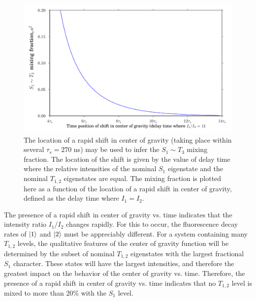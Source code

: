 \documentclass[12pt]{mitthesis}
\begin{document}
\begin{figure}
  \caption{The location of a rapid shift in center of gravity (taking
    place within several $\tau_s = 270$ ns) may be used to infer the
    $S_1 \sim T_3$ mixing fraction.  The location of the shift is
    given by the value of delay time where the relative intensities of
    the nominal $S_1$ eigenstate and the nominal $T_{1,2}$ eigenstates
    are equal.  The mixing fraction is plotted here as a function of
    the location of a rapid shift in center of gravity, defined as the
    delay time where $I_1 = I_2$.}
  \label{fig:cog-inflection-point}

  \centering
  \includegraphics[width=6in]{cog-inflection-point.pdf}
\end{figure}

The presence of a rapid shift in center of gravity vs. time indicates
that the intensity ratio $I_1/I_2$ changes rapidly.  For this to
occur, the fluorescence decay rates of $\mathinner{|{1}\rangle}$ and $\mathinner{|{2}\rangle}$ must be
appreciably different.  For a system containing many $T_{1,2}$ levels,
the qualitative features of the center of gravity function will be
determined by the subset of nominal $T_{1,2}$ eigenstates with the
largest fractional $S_1$ character.  These states will have the
largest intensities, and therefore the greatest impact on the
behavior of the center of gravity vs. time.  Therefore, the presence
of a rapid shift in center of gravity vs. time indicates that no
$T_{1,2}$ level is mixed to more than 20\% with the $S_1$ level.
\end{document}

